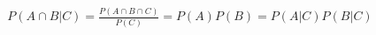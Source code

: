 \documentclass[../../probability-notes.tex]{subfile}
\begin{document}
    \begin{align*}
        P(A \cap B | C) = \frac{P(A \cap B \cap C)}{P(C)} = P(A)P(B) = P(A|C)P(B|C) \tag*{Due to independence}
    \end{align*}
\end{document}
